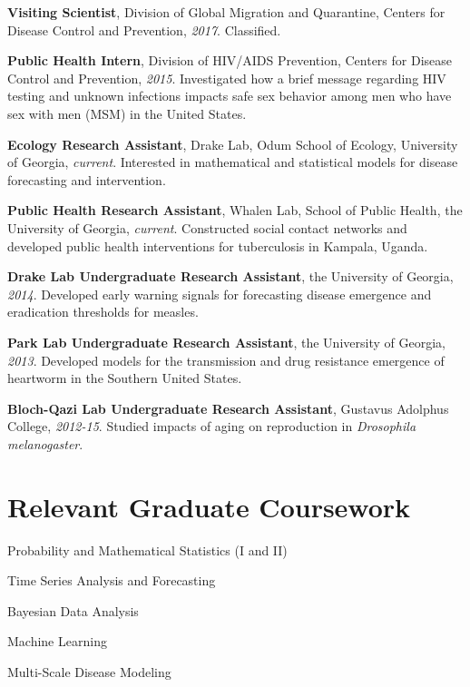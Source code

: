 \documentclass[letterpaper]{article}
\renewenvironment{itemize}{
  \begin{list}{}{
    \setlength{\leftmargin}{1.5em}
  }
}{
  \end{list}
}
\begin{document}
\begin{itemize}
\item \textbf{Visiting Scientist}, Division of Global Migration and Quarantine, Centers for Disease Control and Prevention, \textit{2017}. Classified.
\item \textbf{Public Health Intern}, Division of HIV/AIDS Prevention, Centers for Disease Control and Prevention, \textit{2015}. Investigated how a brief message regarding HIV testing and unknown infections impacts safe sex behavior among men who have sex with men (MSM) in the United States.
\item \textbf{Ecology Research Assistant}, Drake Lab, Odum School of Ecology, University of Georgia, \textit{current}. Interested in mathematical and statistical models for disease forecasting and intervention. 
\item \textbf{Public Health Research Assistant}, Whalen Lab, School of Public Health, the University of Georgia, \textit{current}. Constructed social contact networks and developed public health interventions for tuberculosis in Kampala, Uganda. 
\item \textbf{Drake Lab Undergraduate Research Assistant}, the University of Georgia, \textit{2014}. Developed early warning signals for forecasting disease emergence and eradication thresholds  for measles.
\item \textbf{Park Lab Undergraduate Research Assistant}, the University of Georgia, \textit{2013}. Developed models for the transmission and drug resistance emergence of heartworm in the Southern United States. 
\item \textbf{Bloch-Qazi Lab Undergraduate Research Assistant}, Gustavus Adolphus College, \textit{2012-15}. Studied impacts of aging on reproduction in \textit{Drosophila melanogaster}. 

\end{itemize}

\section*{Relevant Graduate Coursework}
\begin{itemize}
\item Probability and Mathematical Statistics (I and II)
\item Time Series Analysis and Forecasting
\item Bayesian Data Analysis
\item Machine Learning 
\item Multi-Scale Disease Modeling
\end{itemize}
\end{document}

